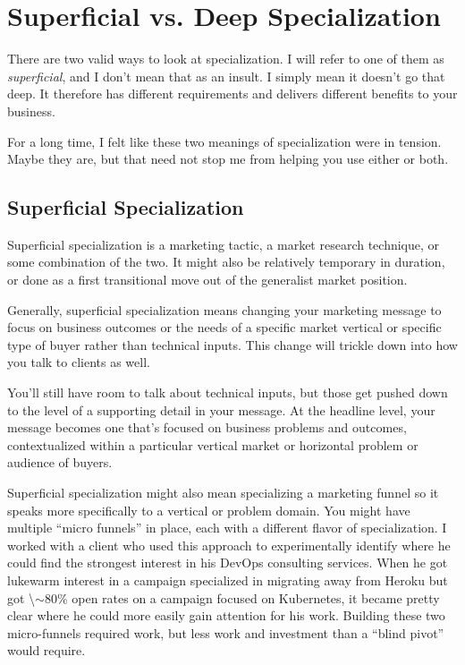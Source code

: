 \chapter{Superficial vs. Deep Specialization}

There are two valid ways to look at specialization. I will refer to one of them as \emph{superficial}, and I don't mean that as an insult. I simply mean it doesn't go that deep. It therefore has different requirements and delivers different benefits to your business.

For a long time, I felt like these two meanings of specialization were in tension. Maybe they are, but that need not stop me from helping you use either or both.

\section{Superficial Specialization}

Superficial specialization is a marketing tactic, a market research technique, or some combination of the two. It might also be relatively temporary in duration, or done as a first transitional move out of the generalist market position.

Generally, superficial specialization means changing your marketing message to focus on business outcomes or the needs of a specific market vertical or specific type of buyer rather than technical inputs. This change will trickle down into how you talk to clients as well.

You'll still have room to talk about technical inputs, but those get pushed down to the level of a supporting detail in your message. At the headline level, your message becomes one that's focused on business problems and outcomes, contextualized within a particular vertical market or horizontal problem or audience of buyers.

Superficial specialization might also mean specializing a marketing funnel so it speaks more specifically to a vertical or problem domain. You might have multiple ``micro funnels'' in place, each with a different flavor of specialization. I worked with a client who used this approach to experimentally identify where he could find the strongest interest in his DevOps consulting services. When he got lukewarm interest in a campaign specialized in migrating away from Heroku but got \textbackslash{}\ensuremath{\sim}80\% open rates on a campaign focused on Kubernetes, it became pretty clear where he could more easily gain attention for his work. Building these two micro-funnels required work, but less work and investment than a ``blind pivot'' would require.

